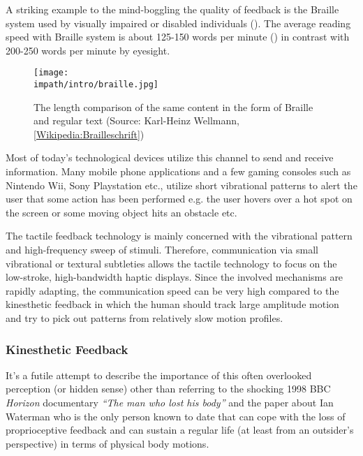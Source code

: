 A striking example to the mind-boggling the quality of feedback is the Braille system used by visually impaired or disabled individuals (). The average reading speed with Braille system is about 125-150 words per minute (\cite{americanblind}) in contrast with 200-250 words per minute by eyesight. 

\begin{figure}%
\centering
\texttt{[image: \\impath/intro/braille.jpg]}%
\caption[The length comparison of the same content in the form of Braille and 
regular text]{The length comparison of the same content in the form of Braille and 
regular text (Source: Karl-Heinz Wellmann, 
\href{http://de.wikipedia.org/wiki/Brailleschrift}{[Wikipedia:Brailleschrift]})}%
\label{fig:braille}%
\end{figure}

Most of today's technological devices utilize this channel to send and receive information. Many mobile phone applications and a few gaming consoles such as Nintendo Wii\raisebox{0.5ex}{\scriptsize\texttrademark}, Sony Playstation\raisebox{0.5ex}{\scriptsize\texttrademark} etc., utilize short vibrational patterns to alert the user that some action has been performed e.g. the user hovers over a hot spot on the screen or some moving object hits an obstacle etc. 

The tactile feedback technology is mainly concerned with the vibrational pattern and high-frequency sweep of stimuli. Therefore, communication via small vibrational or textural subtleties allows the tactile technology to focus on the low-stroke, high-bandwidth haptic displays. Since the involved mechanisms are rapidly adapting, the communication speed can be very high compared to the kinesthetic feedback in which the human should track large amplitude motion and try to pick out patterns from relatively slow motion profiles. 


\subsubsection{Kinesthetic Feedback}
It's a futile attempt to describe the importance of this often overlooked perception (or hidden sense) other than referring to the shocking 1998 BBC \emph{Horizon} documentary \emph{``The man who lost his body''} and the paper \cite{waterman} about Ian Waterman who is the only person known to date that can cope with the loss of proprioceptive feedback and can sustain a regular life (at least from an outsider's perspective) in terms of physical body motions. 




